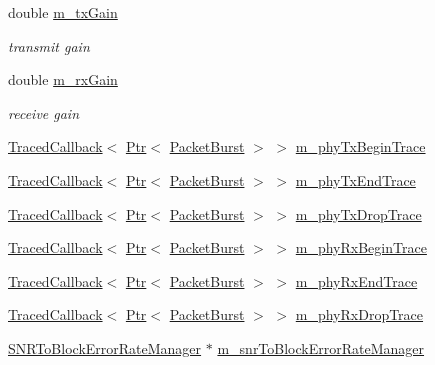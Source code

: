 \begin{DoxyCompactItemize}
double \hyperlink{classns3_1_1SimpleOfdmWimaxPhy_a2997c003cdde2c86a4ee6a5de5e04e8a}{m\+\_\+tx\+Gain}
\begin{DoxyCompactList}\small\item\em transmit gain \end{DoxyCompactList}\item 
double \hyperlink{classns3_1_1SimpleOfdmWimaxPhy_a40fbda9beb958e00d6ad721feedaf7d5}{m\+\_\+rx\+Gain}
\begin{DoxyCompactList}\small\item\em receive gain \end{DoxyCompactList}\item 
\hyperlink{classns3_1_1TracedCallback}{Traced\+Callback}$<$ \hyperlink{classns3_1_1Ptr}{Ptr}$<$ \hyperlink{classns3_1_1PacketBurst}{Packet\+Burst} $>$ $>$ \hyperlink{classns3_1_1SimpleOfdmWimaxPhy_a21e5bdd806cdcf9776bf226d23fc98ca}{m\+\_\+phy\+Tx\+Begin\+Trace}
\item 
\hyperlink{classns3_1_1TracedCallback}{Traced\+Callback}$<$ \hyperlink{classns3_1_1Ptr}{Ptr}$<$ \hyperlink{classns3_1_1PacketBurst}{Packet\+Burst} $>$ $>$ \hyperlink{classns3_1_1SimpleOfdmWimaxPhy_a25cc58eaaab4ca6692c29140562c709c}{m\+\_\+phy\+Tx\+End\+Trace}
\item 
\hyperlink{classns3_1_1TracedCallback}{Traced\+Callback}$<$ \hyperlink{classns3_1_1Ptr}{Ptr}$<$ \hyperlink{classns3_1_1PacketBurst}{Packet\+Burst} $>$ $>$ \hyperlink{classns3_1_1SimpleOfdmWimaxPhy_aebbb0af4dbce1a78fa142597a96b3910}{m\+\_\+phy\+Tx\+Drop\+Trace}
\item 
\hyperlink{classns3_1_1TracedCallback}{Traced\+Callback}$<$ \hyperlink{classns3_1_1Ptr}{Ptr}$<$ \hyperlink{classns3_1_1PacketBurst}{Packet\+Burst} $>$ $>$ \hyperlink{classns3_1_1SimpleOfdmWimaxPhy_a1681c13eaa52d28c39f2232b9148417d}{m\+\_\+phy\+Rx\+Begin\+Trace}
\item 
\hyperlink{classns3_1_1TracedCallback}{Traced\+Callback}$<$ \hyperlink{classns3_1_1Ptr}{Ptr}$<$ \hyperlink{classns3_1_1PacketBurst}{Packet\+Burst} $>$ $>$ \hyperlink{classns3_1_1SimpleOfdmWimaxPhy_a02734dac1757daecf21e5c53fced860e}{m\+\_\+phy\+Rx\+End\+Trace}
\item 
\hyperlink{classns3_1_1TracedCallback}{Traced\+Callback}$<$ \hyperlink{classns3_1_1Ptr}{Ptr}$<$ \hyperlink{classns3_1_1PacketBurst}{Packet\+Burst} $>$ $>$ \hyperlink{classns3_1_1SimpleOfdmWimaxPhy_a0dc52213d50436ee17875d8fee2671ce}{m\+\_\+phy\+Rx\+Drop\+Trace}
\item 
\hyperlink{classns3_1_1SNRToBlockErrorRateManager}{S\+N\+R\+To\+Block\+Error\+Rate\+Manager} $\ast$ \hyperlink{classns3_1_1SimpleOfdmWimaxPhy_a84b79db3c0e61c0797765a154c50c24e}{m\+\_\+snr\+To\+Block\+Error\+Rate\+Manager}

\end{DoxyCompactItemize}
